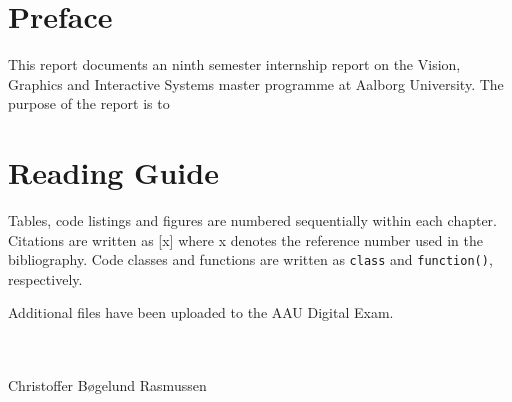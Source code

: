 \glsresetall
\section*{Preface}
This report documents an ninth semester internship report on the Vision, Graphics and Interactive Systems master programme at Aalborg University. The purpose of the report is to 
\section*{Reading Guide}
Tables, code listings and figures are numbered sequentially within each chapter. Citations are written as [x] where x denotes the reference number used in the bibliography. Code classes and functions are written as \lstinline{class} and \lstinline{function()}, respectively.\\

Additional files have been uploaded to the AAU Digital Exam. 

\vfill
~\\
\makebox[8 cm]{\hrulefill}\\
Christoffer Bøgelund Rasmussen\\
~\\
